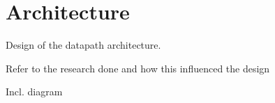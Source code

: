 

\chapter{Architecture}


Design of the datapath architecture.

Refer to the research done and how this influenced the design

Incl. diagram 




